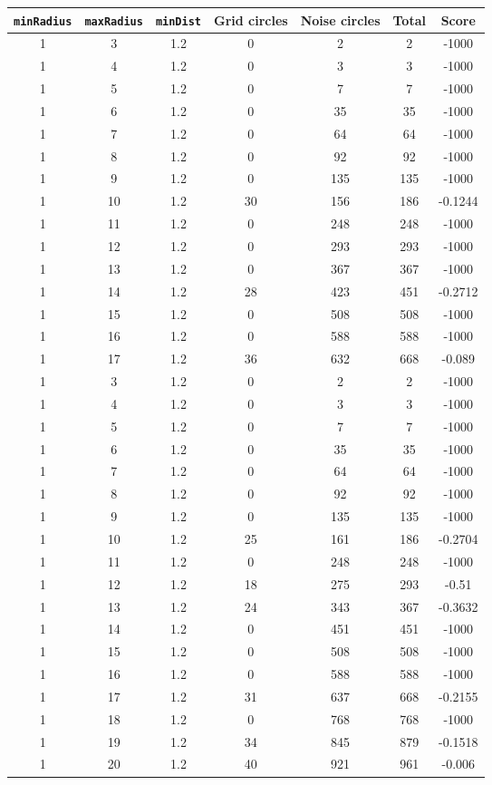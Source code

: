 \documentclass[letterpaper, 12pt]{article}
\begin{document}
\begin{longtable}{|c|c|c|c|c|c|c|}
\hline
\textbf{\texttt{minRadius}} & \textbf{\texttt{maxRadius}} & \textbf{\texttt{minDist}} & \textbf{Grid circles} & \textbf{Noise circles} & \textbf{Total} & \textbf{Score} \\
\hline
1 & 3 & 1.2 & 0 & 2 & 2 & -1000 \\
\hline
1 & 4 & 1.2 & 0 & 3 & 3 & -1000 \\
\hline
1 & 5 & 1.2 & 0 & 7 & 7 & -1000 \\
\hline
1 & 6 & 1.2 & 0 & 35 & 35 & -1000 \\
\hline
1 & 7 & 1.2 & 0 & 64 & 64 & -1000 \\
\hline
1 & 8 & 1.2 & 0 & 92 & 92 & -1000 \\
\hline
1 & 9 & 1.2 & 0 & 135 & 135 & -1000 \\
\hline
1 & 10 & 1.2 & 30 & 156 & 186 & -0.1244 \\
\hline
1 & 11 & 1.2 & 0 & 248 & 248 & -1000 \\
\hline
1 & 12 & 1.2 & 0 & 293 & 293 & -1000 \\
\hline
1 & 13 & 1.2 & 0 & 367 & 367 & -1000 \\
\hline
1 & 14 & 1.2 & 28 & 423 & 451 & -0.2712 \\
\hline
1 & 15 & 1.2 & 0 & 508 & 508 & -1000 \\
\hline
1 & 16 & 1.2 & 0 & 588 & 588 & -1000 \\
\hline
1 & 17 & 1.2 & 36 & 632 & 668 & -0.089 \\
\hline
1 & 3 & 1.2 & 0 & 2 & 2 & -1000 \\
\hline
1 & 4 & 1.2 & 0 & 3 & 3 & -1000 \\
\hline
1 & 5 & 1.2 & 0 & 7 & 7 & -1000 \\
\hline
1 & 6 & 1.2 & 0 & 35 & 35 & -1000 \\
\hline
1 & 7 & 1.2 & 0 & 64 & 64 & -1000 \\
\hline
1 & 8 & 1.2 & 0 & 92 & 92 & -1000 \\
\hline
1 & 9 & 1.2 & 0 & 135 & 135 & -1000 \\
\hline
1 & 10 & 1.2 & 25 & 161 & 186 & -0.2704 \\
\hline
1 & 11 & 1.2 & 0 & 248 & 248 & -1000 \\
\hline
1 & 12 & 1.2 & 18 & 275 & 293 & -0.51 \\
\hline
1 & 13 & 1.2 & 24 & 343 & 367 & -0.3632 \\
\hline
1 & 14 & 1.2 & 0 & 451 & 451 & -1000 \\
\hline
1 & 15 & 1.2 & 0 & 508 & 508 & -1000 \\
\hline
1 & 16 & 1.2 & 0 & 588 & 588 & -1000 \\
\hline
1 & 17 & 1.2 & 31 & 637 & 668 & -0.2155 \\
\hline
1 & 18 & 1.2 & 0 & 768 & 768 & -1000 \\
\hline
1 & 19 & 1.2 & 34 & 845 & 879 & -0.1518 \\
\hline
1 & 20 & 1.2 & 40 & 921 & 961 & -0.006 \\
\hline
\end{longtable}
\end{document}
